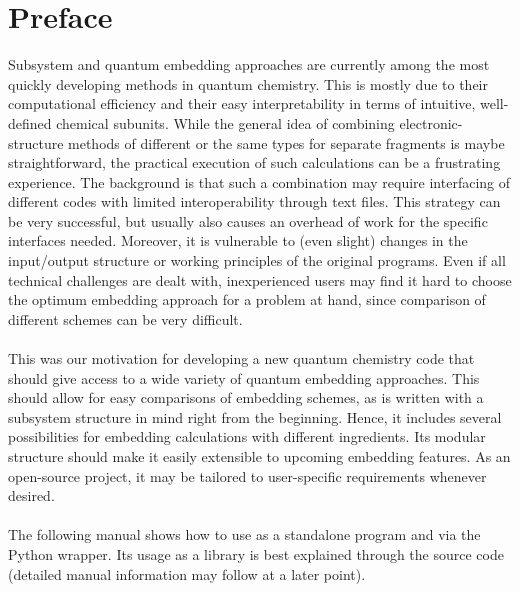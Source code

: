 \chapter{Preface}
Subsystem and quantum embedding approaches are currently among the most quickly developing
methods in quantum chemistry. This is mostly due to their computational efficiency
and their easy interpretability in terms of intuitive, well-defined chemical subunits.
While the general idea of combining electronic-structure methods of different or the same
types for separate fragments is maybe straightforward, the practical execution of such
calculations can be a frustrating experience. The background is that such a combination
may require interfacing of different codes with limited interoperability through text files.
This strategy can be very successful, but usually also causes an overhead of work for the specific
interfaces needed. Moreover, it is vulnerable to (even slight) changes in the input/output
structure or working principles of the original programs. Even if all technical challenges
are dealt with, inexperienced users may find it hard to choose the optimum embedding approach
for a problem at hand, since comparison of different schemes can be very difficult.\\
\\
This was our motivation for developing a new quantum chemistry code that should give access
to a wide variety of quantum embedding approaches. This should allow for easy comparisons
of embedding schemes, as \serenity is written with a subsystem structure in mind right from
the beginning. Hence, it includes several possibilities for embedding calculations with
different ingredients. Its modular structure should make it easily extensible to upcoming
embedding features. As an open-source project, it may be tailored to user-specific requirements
whenever desired.\\
\\
The following manual shows how to use \serenity as a standalone program and via the Python wrapper. Its usage as a
library is best explained through the source code (detailed manual
information may follow at a later point).
